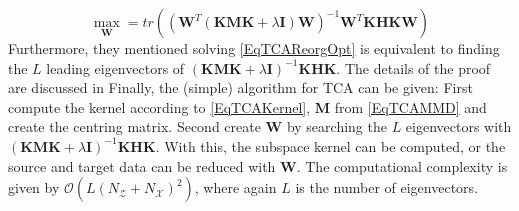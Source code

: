 \begin{equation}\label{EqTCAReorgOpt}
	\max_{\mathbf{W}} = tr((\mathbf{W}^T(\mathbf{KMK}+\lambda \mathbf{I})\mathbf{W})^{-1} \mathbf{W}^T\mathbf{KHKW})
\end{equation}
Furthermore, they mentioned solving \eqref{EqTCAReorgOpt} is equivalent to finding the $L$ leading eigenvectors of $(\mathbf{KMK}+\lambda \mathbf{I})^{-1} \mathbf{KHK}$.
The details of the proof are discussed in \cite{Pan.2011}
Finally, the (simple) algorithm for \acs{TCA} can be given:
First compute the kernel according to \eqref{EqTCAKernel}, $\mathbf{M}$ from \eqref{EqTCAMMD} and create the centring matrix.
Second create $\mathbf{W}$ by searching the $L$ eigenvectors with $(\mathbf{KMK}+\lambda \mathbf{I})^{-1} \mathbf{KHK}$.
With this, the subspace kernel can be computed, or the source and target data can be reduced with $\mathbf{W}$.
The computational complexity is given by $\mathcal{O}(L(N_\mathcal{Z}+N_\mathcal{X})^2)$, where again $L$ is the number of eigenvectors.\cite{Pan.2011}
